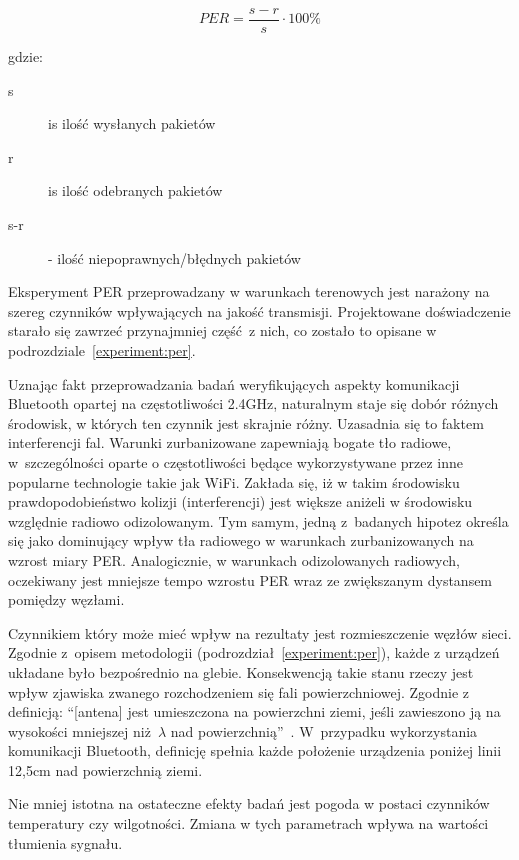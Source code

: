 \begin{equation}
\label{per_equation}
PER = \frac{s - r}{s} \cdot 100\%
\end{equation}

gdzie:

\begin{description}
\item[s] is ilość wysłanych pakietów
\item[r] is ilość odebranych pakietów
\item[s-r] - ilość niepoprawnych/błędnych pakietów
\end{description}

Eksperyment PER przeprowadzany w warunkach terenowych jest narażony na szereg czynników wpływających
na jakość transmisji. Projektowane doświadczenie starało się zawrzeć przynajmniej część z nich, co
zostało to opisane w podrozdziale~\ref{experiment:per}.

Uznając fakt przeprowadzania badań weryfikujących aspekty komunikacji Bluetooth opartej na częstotliwości
2.4GHz, naturalnym staje się dobór różnych środowisk, w których ten czynnik jest skrajnie różny.
Uzasadnia się to faktem interferencji fal. Warunki zurbanizowane zapewniają bogate tło radiowe,
w~szczególności oparte o częstotliwości będące wykorzystywane przez inne popularne technologie
takie jak WiFi. Zakłada się, iż w takim środowisku prawdopodobieństwo kolizji (interferencji)
jest większe aniżeli w środowisku względnie radiowo odizolowanym. Tym samym, jedną z~badanych
hipotez określa się jako dominujący wpływ tła radiowego w warunkach zurbanizowanych na wzrost
miary \gls{PER}. Analogicznie, w warunkach odizolowanych radiowych, oczekiwany jest mniejsze
tempo wzrostu PER wraz ze zwiększanym dystansem pomiędzy węzłami.

Czynnikiem który może mieć wpływ na rezultaty jest rozmieszczenie węzłów sieci. Zgodnie
z~opisem metodologii (podrozdział~\ref{experiment:per}), każde z urządzeń układane było
bezpośrednio na glebie. Konsekwencją takie stanu rzeczy jest wpływ zjawiska zwanego
rozchodzeniem się fali powierzchniowej. Zgodnie z definicją: \enquote{[antena] jest umieszczona na powierzchni
ziemi, jeśli zawieszono ją na wysokości mniejszej niż $\lambda$ nad powierzchnią}~\cite{szostka_fale_2006}. 
W~przypadku wykorzystania komunikacji Bluetooth, definicję spełnia każde położenie
urządzenia poniżej linii 12,5cm nad powierzchnią ziemi.

Nie mniej istotna na ostateczne efekty badań jest pogoda w postaci czynników temperatury
czy wilgotności. Zmiana w tych parametrach wpływa na wartości tłumienia sygnału.
